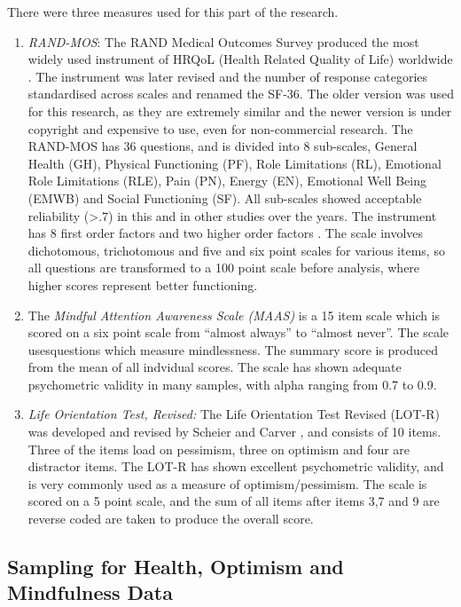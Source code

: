 \documentclass{article}
\begin{document}
There were three measures used for this part of the research.
\begin{enumerate}
\item \textit{RAND-MOS}: The RAND Medical Outcomes Survey produced the most widely used instrument of HRQoL (Health Related Quality of Life) worldwide \cite{hays1993rand}. The instrument was later revised and the number of response categories standardised across scales and renamed the SF-36. The older version was used for this research, as they are extremely similar and the newer version is under copyright and expensive to use, even for non-commercial research. The RAND-MOS has 36 questions, and is divided into 8 sub-scales, General Health (GH),
Physical Functioning (PF), Role Limitations (RL), Emotional Role Limitations
(RLE), Pain (PN), Energy (EN), Emotional Well Being (EMWB) and Social
Functioning (SF). All sub-scales showed acceptable reliability
(>.7) in this and in other studies over the years\cite{Lam2007, Ferreira2000}.
The instrument has 8 first order factors and two higher order factors
\cite{Hann2008}. The scale involves dichotomous, trichotomous and
five and six point scales for various items, so all questions are
transformed to a 100 point scale before analysis, where higher scores
represent better functioning.
\item The \textit{Mindful Attention Awareness Scale (MAAS)}
\cite{brown2003benefits} is a 15 item scale which is scored on
a six point scale from ``almost always'' to ``almost never''. The scale usesquestions which measure mindlessness. The summary score is produced
from the mean of all indvidual scores. The scale has shown adequate
psychometric validity in many samples, with alpha ranging from 0.7
to 0.9\cite{brown2003benefits,Ruth2006}.
\item \textit{Life Orientation Test, Revised:} The Life Orientation Test Revised (LOT-R) was developed and revised
by Scheier and Carver \cite{Scheier1994}, and consists of 10 items.
Three of the items load on pessimism, three on optimism and four are
distractor items. The LOT-R has shown excellent psychometric validity,
and is very commonly used as a measure of optimism/pessimism. The
scale is scored on a 5 point scale,
and the sum of all items after items 3,7 and 9 are reverse coded are taken to produce the overall score.
\end{enumerate}



\subsection{Sampling for Health, Optimism and Mindfulness Data}
\end{document}

